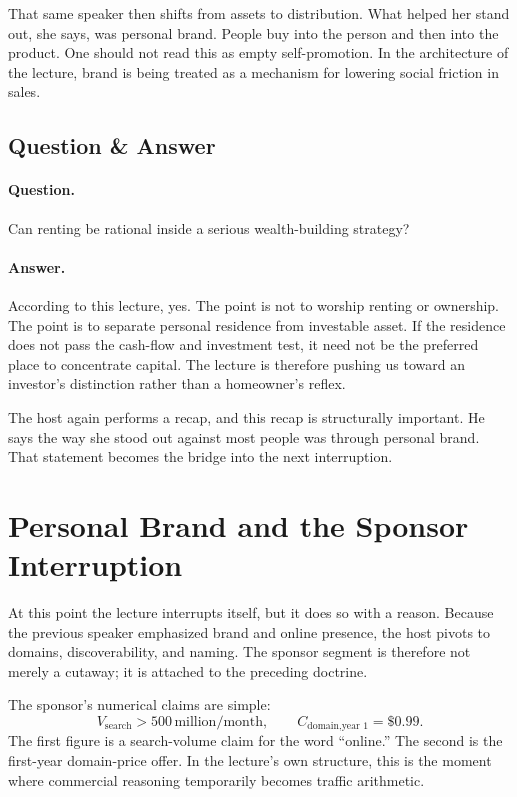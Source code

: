 That same speaker then shifts from assets to distribution. What helped her stand out, she says, was personal brand. People buy into the person and then into the product. One should not read this as empty self-promotion. In the architecture of the lecture, brand is being treated as a mechanism for lowering social friction in sales.

\subsection{Question \& Answer}

\paragraph{Question.} Can renting be rational inside a serious wealth-building strategy?

\paragraph{Answer.} According to this lecture, yes. The point is not to worship renting or ownership. The point is to separate personal residence from investable asset. If the residence does not pass the cash-flow and investment test, it need not be the preferred place to concentrate capital. The lecture is therefore pushing us toward an investor's distinction rather than a homeowner's reflex.

The host again performs a recap, and this recap is structurally important. He says the way she stood out against most people was through personal brand. That statement becomes the bridge into the next interruption.

\section{Personal Brand and the Sponsor Interruption}

At this point the lecture interrupts itself, but it does so with a reason. Because the previous speaker emphasized brand and online presence, the host pivots to domains, discoverability, and naming. The sponsor segment is therefore not merely a cutaway; it is attached to the preceding doctrine.

The sponsor's numerical claims are simple:
\begin{equation}
V_{\text{search}} > 500\,\text{million/month},\qquad
C_{\text{domain,year 1}} = \$0.99.
\end{equation}
The first figure is a search-volume claim for the word ``online.'' The second is the first-year domain-price offer. In the lecture's own structure, this is the moment where commercial reasoning temporarily becomes traffic arithmetic.

